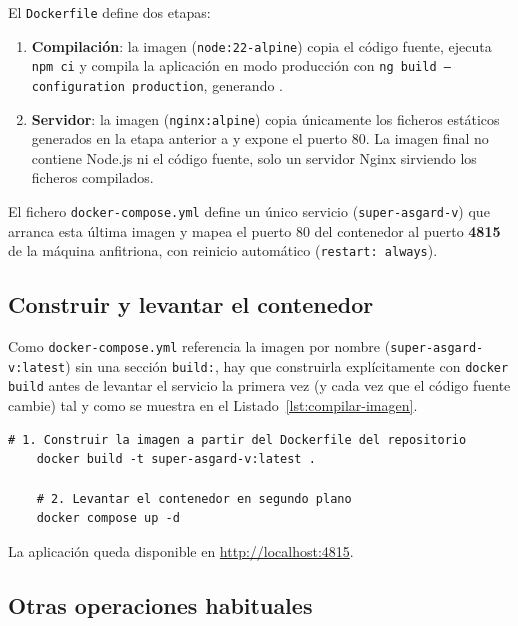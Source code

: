 \documentclass[../main.tex]{subfiles}
\begin{document}
El \texttt{Dockerfile} define dos etapas:

\begin{enumerate}
	\item \textbf{Compilación}: la imagen (\texttt{node:22-alpine}) copia el código fuente, ejecuta \texttt{npm ci} y compila la aplicación en modo producción con \texttt{ng build --configuration production}, generando .
	\item \textbf{Servidor}: la imagen (\texttt{nginx:alpine}) copia únicamente los ficheros estáticos generados en la etapa anterior a  y expone el puerto 80. La imagen final no contiene Node.js ni el código fuente, solo un servidor Nginx sirviendo los ficheros compilados.
\end{enumerate}

El fichero \texttt{docker-compose.yml} define un único servicio (\texttt{super-asgard-v}) que arranca esta última imagen y mapea el puerto 80 del contenedor al puerto \textbf{4815} de la máquina anfitriona, con reinicio automático (\texttt{restart: always}).

\subsection{Construir y levantar el contenedor}

Como \texttt{docker-compose.yml} referencia la imagen por nombre (\texttt{super-asgard-v:latest}) sin una sección \texttt{build:}, hay que construirla explícitamente con \texttt{docker build} antes de levantar el servicio la primera vez (y cada vez que el código fuente cambie) tal y como se muestra en el Listado~\ref{lst:compilar-imagen}.

\begin{lstlisting}[caption={Comandos para construir la imagen de la aplicación.},label={lst:compilar-imagen}]
	# 1. Construir la imagen a partir del Dockerfile del repositorio
	docker build -t super-asgard-v:latest .
	
	# 2. Levantar el contenedor en segundo plano
	docker compose up -d
\end{lstlisting}

La aplicación queda disponible en \url{http://localhost:4815}.

\subsection{Otras operaciones habituales}
\end{document}
